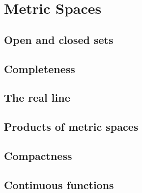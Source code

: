 \chapter{Metric Spaces}
\section{Open and closed sets}

\section{Completeness}
\section{The real line}
\section{Products of metric spaces}
\section{Compactness}
\section{Continuous functions}

